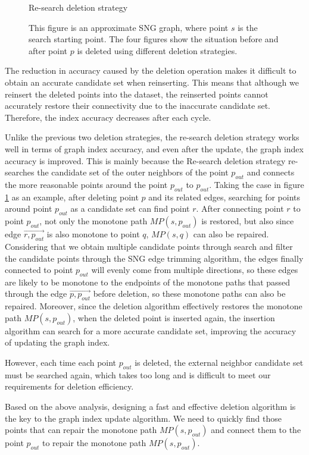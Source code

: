 \begin{figure}[h]
\begin{minipage}{0.49\linewidth}
		Re-search deletion strategy
	\end{minipage}
	\caption{This figure is an approximate SNG graph, where point $s$ is the search starting point. The four figures show the situation before and after point $p$ is deleted using different deletion strategies.}
	\label{MSNET_delete}
\end{figure}

The reduction in accuracy caused by the deletion operation makes it difficult to obtain an accurate candidate set when reinserting. This means that although we reinsert the deleted points into the dataset, the reinserted points cannot accurately restore their connectivity due to the inaccurate candidate set. Therefore, the index accuracy decreases after each cycle.

Unlike the previous two deletion strategies, the re-search deletion strategy works well in terms of graph index accuracy, and even after the update, the graph index accuracy is improved. This is mainly because the Re-search deletion strategy re-searches the candidate set of the outer neighbors of the point $p_{out}$ and connects the more reasonable points around the point $p_{out}$ to $p_{out}$. Taking the case in figure \ref{MSNET_delete} as an example, after deleting point $p$ and its related edges, searching for points around point $p_{out}$ as a candidate set can find point $r$. After connecting point $r$ to point $p_{out}$, not only the monotone path $MP(s,p_{out })$ is restored, but also since edge $\overrightarrow{r,p_{out}}$ is also monotone to point $q$, $MP(s,q)$ can also be repaired. Considering that we obtain multiple candidate points through search and filter the candidate points through the SNG edge trimming algorithm, the edges finally connected to point $p_{out}$ will evenly come from multiple directions, so these edges are likely to be monotone to the endpoints of the monotone paths that passed through the edge $\overrightarrow{p,p_{out}}$ before deletion, so these monotone paths can also be repaired. Moreover, since the deletion algorithm effectively restores the monotone path $MP(s,p_{out })$, when the deleted point is inserted again, the insertion algorithm can search for a more accurate candidate set, improving the accuracy of updating the graph index.

However, each time each point $p_{out}$ is deleted, the external neighbor candidate set must be searched again, which takes too long and is difficult to meet our requirements for deletion efficiency.

Based on the above analysis, designing a fast and effective deletion algorithm is the key to the graph index update algorithm. We need to quickly find those points that can repair the monotone path $MP(s,p_{out})$ and connect them to the point $p_{out}$ to repair the monotone path $MP(s,p_{out})$.



